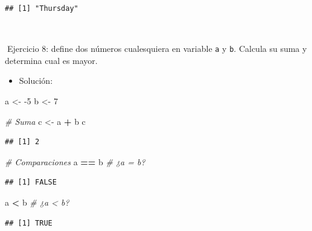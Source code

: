 \documentclass[11pt,]{book}
\newenvironment{Shaded}{\begin{snugshade}}{\end{snugshade}}
\newcommand{\CommentTok}[1]{\textcolor[rgb]{0.37,0.37,0.37}{\textit{#1}}}
\newcommand{\DecValTok}[1]{\textcolor[rgb]{0.06,0.06,0.06}{#1}}
\newcommand{\NormalTok}[1]{#1}
\newcommand{\OperatorTok}[1]{\textcolor[rgb]{0.43,0.43,0.43}{\textbf{#1}}}
\newcommand{\StringTok}[1]{\textcolor[rgb]{0.5,0.5,0.5}{#1}}
\providecommand{\tightlist}{%
  \setlength{\itemsep}{0pt}\setlength{\parskip}{0pt}}
\begin{document}
\begin{verbatim}
## [1] "Thursday"
\end{verbatim}

~

📝Ejercicio 8: define dos números cualesquiera en variable \texttt{a} y \texttt{b}. Calcula su suma y determina cual es mayor.

\begin{itemize}
\tightlist
\item
  Solución:
\end{itemize}

\begin{Shaded}
\begin{Highlighting}[]
\NormalTok{a <-}\StringTok{ }\DecValTok{-5}
\NormalTok{b <-}\StringTok{ }\DecValTok{7}

\CommentTok{# Suma}
\NormalTok{c <-}\StringTok{ }\NormalTok{a }\OperatorTok{+}\StringTok{ }\NormalTok{b}
\NormalTok{c}
\end{Highlighting}
\end{Shaded}

\begin{verbatim}
## [1] 2
\end{verbatim}

\begin{Shaded}
\begin{Highlighting}[]
\CommentTok{# Comparaciones}
\NormalTok{a }\OperatorTok{==}\StringTok{ }\NormalTok{b }\CommentTok{# ¿a = b?}
\end{Highlighting}
\end{Shaded}

\begin{verbatim}
## [1] FALSE
\end{verbatim}

\begin{Shaded}
\begin{Highlighting}[]
\NormalTok{a }\OperatorTok{<}\StringTok{ }\NormalTok{b }\CommentTok{# ¿a < b?}
\end{Highlighting}
\end{Shaded}

\begin{verbatim}
## [1] TRUE
\end{verbatim}

~


\end{document}
